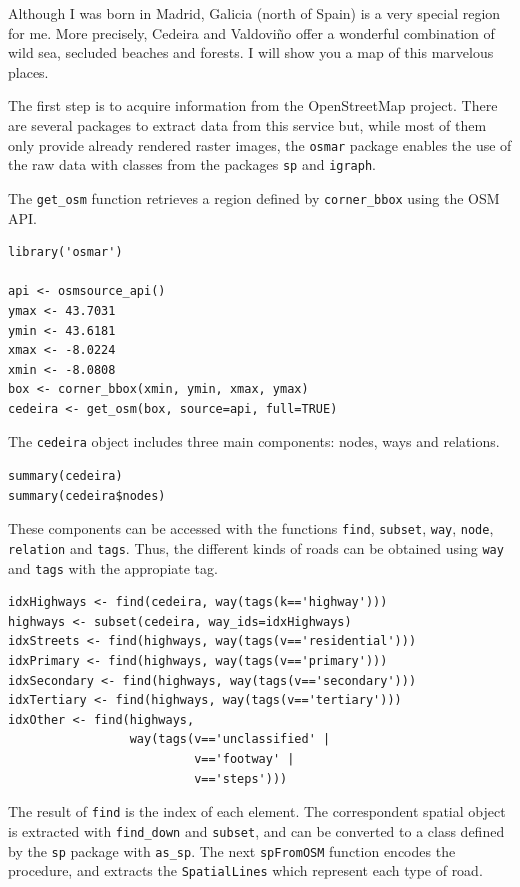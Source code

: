 


Although I was born in Madrid, Galicia (north of Spain) is a very
special region for me. More precisely, Cedeira and Valdoviño offer
a wonderful combination of wild sea, secluded beaches and
forests. I will show you a map of this marvelous places. 

The first step is to acquire information from the OpenStreetMap
project. There are several packages to extract data from this
service but, while most of them only provide already rendered
raster images, the \texttt{osmar} package enables the use of the raw data
with classes from the packages \texttt{sp} and \texttt{igraph}.

The \texttt{get\_osm} function retrieves a region defined by \texttt{corner\_bbox}
using the OSM API.


\lstset{language=R}
\begin{lstlisting}
library('osmar')

api <- osmsource_api()
ymax <- 43.7031
ymin <- 43.6181
xmax <- -8.0224
xmin <- -8.0808
box <- corner_bbox(xmin, ymin, xmax, ymax)
cedeira <- get_osm(box, source=api, full=TRUE)
\end{lstlisting}


The \texttt{cedeira} object includes three main components: nodes, ways
and relations. 
  

\lstset{language=R}
\begin{lstlisting}
summary(cedeira)
summary(cedeira$nodes)
\end{lstlisting}

These components can be accessed with the functions \texttt{find}, \texttt{subset}, \texttt{way},
\texttt{node}, \texttt{relation} and \texttt{tags}. Thus, the different kinds of roads
can be obtained using \texttt{way} and \texttt{tags} with the appropiate
tag. 


\lstset{language=R}
\begin{lstlisting}
idxHighways <- find(cedeira, way(tags(k=='highway')))
highways <- subset(cedeira, way_ids=idxHighways)
idxStreets <- find(highways, way(tags(v=='residential')))
idxPrimary <- find(highways, way(tags(v=='primary')))
idxSecondary <- find(highways, way(tags(v=='secondary')))
idxTertiary <- find(highways, way(tags(v=='tertiary')))
idxOther <- find(highways,
                 way(tags(v=='unclassified' |
                          v=='footway' |
                          v=='steps')))
\end{lstlisting}

The result of \texttt{find} is the index of each element. The
correspondent spatial object is extracted with \texttt{find\_down} and
\texttt{subset}, and can be converted to a class defined by the \texttt{sp}
package with \texttt{as\_sp}. The next \texttt{spFromOSM} function encodes the
procedure, and extracts the \texttt{SpatialLines} which represent each
type of road.


